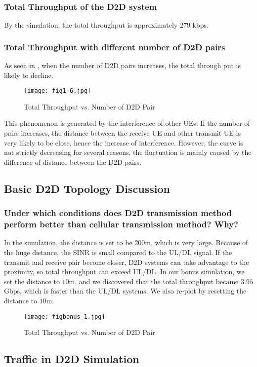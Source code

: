 \documentclass[conference]{IEEEtran}
\begin{document}
\subsubsection{Total Throughput of the D2D system}
By the simulation, the total throughput is approximately $279$ kbps.
\subsubsection{Total Throughput with different number of D2D pairs}
As seen in , when the number of D2D pairs increases, the total through put is likely to decline.

\begin{figure}[htbp]
    \centering
    \texttt{[image: fig1\_6.jpg]}
    \caption{Total Throughput vs. Number of D2D Pair}
    \label{fig:d2d_num}
\end{figure}
 This phenomenon is generated by the interference of other UEs. If the number of pairs increases, the distance between the receive UE and other transmit UE is very likely to be close, hence the increase of interference. However, the curve is not strictly decreasing for several reasons, the fluctuation is mainly caused by the difference of distance between the D2D pairs.
\subsection{Basic D2D Topology Discussion}
\subsubsection{Under which conditions does D2D transmission method perform better than cellular transmission method? Why?}
In the simulation, the distance is set to be $200$m, which is very large. Because of the huge distance, the SINR is small compared to the UL/DL signal. If the transmit and receive pair become closer, D2D systems can take advantage to the proximity, so total throughput can exceed UL/DL. In our bonus simulation, we set the distance to $10$m, and we discovered that the total throughput became $3.95$Gbps, which is faster than the UL/DL systems. We also re-plot  by resetting the distance to $10$m.
\begin{figure}[htbp]
    \centering
    \texttt{[image: figbonus\_1.jpg]}
    \caption{Total Throughput vs. Number of D2D Pair}
    \label{fig:d2d_num}
\end{figure}
\subsection{Traffic in D2D Simulation}
\end{document}
